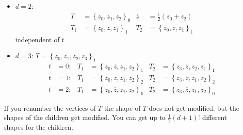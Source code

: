 \begin{example}
	\begin{itemize}
		\item $d=2$:\\
			\begin{align*}
				T &= \left\{ z_{0},z_{1},z_{2} \right\}_{0} & \overline{z}&= \frac{1}{2}\left(z_{0} + z_{2} \right)\\
				T_{1} &= \left\{ z_{0},\overline{z},z_{1} \right\}_{1}  & T_{2} &= \left\{ z_{0},\overline{z},z_{1} \right\}_{1}
			\end{align*}
			independent of $t$
		\item $d= 3$: \quad $T = \left\{ z_{0},z_{1},z_{2},z_{3} \right\}_{t}$
			\begin{align*}
				t&=0: & T_{1}&= \left\{ z_{0},\overline{z}, z_{1},z_{2} \right\}_{1} & T_{2}&= \left\{ z_{3},\overline{z}, z_{2},z_{1} \right\}_{1}\\
				t&=1: & T_{1}&= \left\{ z_{0},\overline{z}, z_{1},z_{2} \right\}_{2} & T_{2}&= \left\{ z_{3},\overline{z}, z_{1},z_{2} \right\}_{2}\\
				t&=2: & T_{1}&= \left\{ z_{0},\overline{z}, z_{1},z_{2} \right\}_{0} & T_{2}&= \left\{ z_{3},\overline{z}, z_{1},z_{2} \right\}_{0}
			\end{align*}
	\end{itemize}
\end{example}
If you renumber the vertices of $T$ the shape of $T$ does not get modified, but the shapes of the children get modified. You can get up to $\frac{1}{2}\left(d+1 \right)!$ different shapes for the children.
